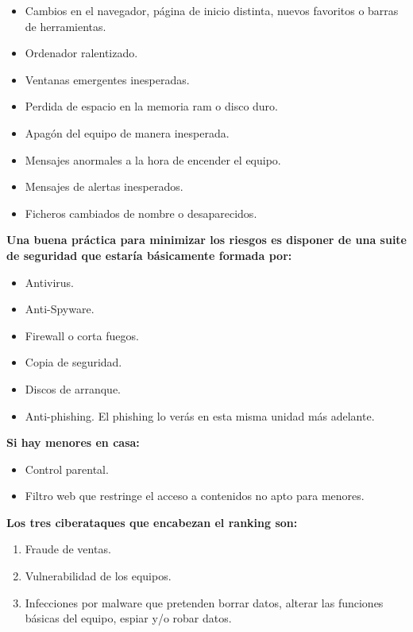 \documentclass[
  a4paper,
  openany]{book}
\begin{document}
\begin{itemize}
\item
  Cambios en el navegador, página de inicio distinta, nuevos favoritos o barras de herramientas.
\item
  Ordenador ralentizado.
\item
  Ventanas emergentes inesperadas.
\item
  Perdida de espacio en la memoria ram o disco duro.
\item
  Apagón del equipo de manera inesperada.
\item
  Mensajes anormales a la hora de encender el equipo.
\item
  Mensajes de alertas inesperados.
\item
  Ficheros cambiados de nombre o desaparecidos.
\end{itemize}

\textbf{Una buena práctica para minimizar los riesgos es disponer de una suite de seguridad que estaría básicamente formada por:}

\begin{itemize}
\item
  Antivirus.
\item
  Anti-Spyware.
\item
  Firewall o corta fuegos.
\item
  Copia de seguridad.
\item
  Discos de arranque.
\item
  Anti-phishing. El phishing lo verás en esta misma unidad más adelante.
\end{itemize}

\textbf{Si hay menores en casa:}

\begin{itemize}
\item
  Control parental.
\item
  Filtro web que restringe el acceso a contenidos no apto para menores.
\end{itemize}

\textbf{Los tres ciberataques que encabezan el ranking son:}

\begin{enumerate}
\def\labelenumi{\arabic{enumi}.}
\item
  Fraude de ventas.
\item
  Vulnerabilidad de los equipos.
\item
  Infecciones por malware que pretenden borrar datos, alterar las funciones básicas del equipo, espiar y/o robar datos.
\end{enumerate}
\end{document}
